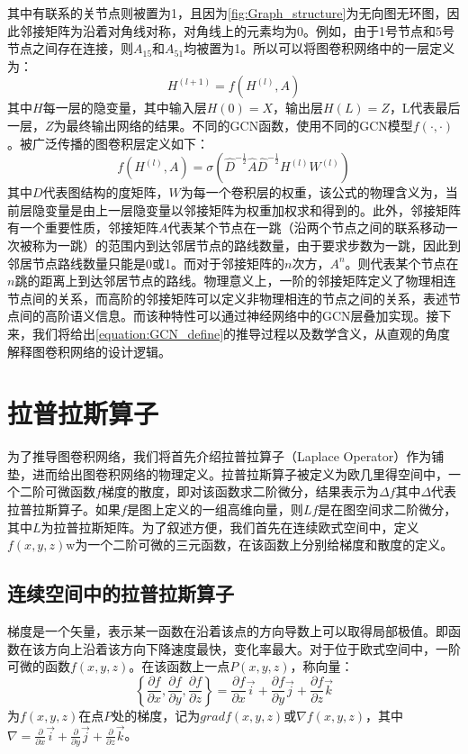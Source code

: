 其中有联系的关节点则被置为1，且因为\ref{fig:Graph_structure}为无向图无环图，因此邻接矩阵为沿着对角线对称，对角线上的元素均为0。例如，由于1号节点和5号节点之间存在连接，则$A_{15}$和$A_{51}$均被置为1。所以可以将图卷积网络中的一层定义为：
\begin{equation}
   H^{(l+1)} = f(H^{(l)} ,A)
    \label{equation:GCN_simple_define}
\end{equation}
其中$H$每一层的隐变量，其中输入层$H(0)=X$，输出层$H(L)=Z$，L代表最后一层，$Z$为最终输出网络的结果。不同的GCN函数，使用不同的GCN模型$f(\cdot,\cdot)$。被广泛传播的图卷积层定义如下：
\begin{equation}
    f(H^{(l)},A) = \sigma\left( \hat{D}^{-\frac{1}{2}} \hat{A} \hat{D}^{-\frac{1}{2}} H^{(l)}W^{(l)} \right)
    \label{equation:GCN_define}
 \end{equation}
其中$D$代表图结构的度矩阵，$W$为每一个卷积层的权重，该公式的物理含义为，当前层隐变量是由上一层隐变量以邻接矩阵为权重加权求和得到的。此外，邻接矩阵有一个重要性质，邻接矩阵$A$代表某个节点在一跳（沿两个节点之间的联系移动一次被称为一跳）的范围内到达邻居节点的路线数量，由于要求步数为一跳，因此到邻居节点路线数量只能是0或1。而对于邻接矩阵的$n$次方，$A^n$。则代表某个节点在$n$跳的距离上到达邻居节点的路线。物理意义上，一阶的邻接矩阵定义了物理相连节点间的关系，而高阶的邻接矩阵可以定义非物理相连的节点之间的关系，表述节点间的高阶语义信息。而该种特性可以通过神经网络中的GCN层叠加实现。接下来，我们将给出\ref{equation:GCN_define}的推导过程以及数学含义，从直观的角度解释图卷积网络的设计逻辑。
\section{拉普拉斯算子}
为了推导图卷积网络，我们将首先介绍拉普拉算子（Laplace Operator）作为铺垫，进而给出图卷积网络的物理定义。拉普拉斯算子被定义为欧几里得空间中，一个二阶可微函数$f$梯度的散度，即对该函数求二阶微分，结果表示为$\Delta f$其中$\Delta$代表拉普拉斯算子。如果$f$是图上定义的一组高维向量，则$Lf$是在图空间求二阶微分，其中$L$为拉普拉斯矩阵。为了叙述方便，我们首先在连续欧式空间中，定义$f(x,y,z)$w为一个二阶可微的三元函数，在该函数上分别给梯度和散度的定义。

\subsection{连续空间中的拉普拉斯算子}
梯度是一个矢量，表示某一函数在沿着该点的方向导数上可以取得局部极值。即函数在该方向上沿着该方向下降速度最快，变化率最大。对于位于欧式空间中，一阶可微的函数$f(x,y,z)$。在该函数上一点$P(x,y,z)$，称向量：
\begin{equation}
    \left\{ \frac{\partial f}{\partial x}, \frac{\partial f}{\partial y}, \frac{\partial f}{\partial z} \right\}= \frac{\partial f}{\partial x}\vec{i} + \frac{\partial f}{\partial y}\vec{j} + \frac{\partial f}{\partial z}\vec{k}
    \label{equation:grad}
\end{equation}
为$f(x,y,z)$在点$P$处的梯度，记为$gradf(x,y,z)$或$\nabla f(x,y,z)$，其中$\nabla = \frac{\partial}{\partial x}\vec{i} + \frac{\partial}{\partial y}\vec{j} + \frac{\partial}{\partial z}\vec{k}$。

